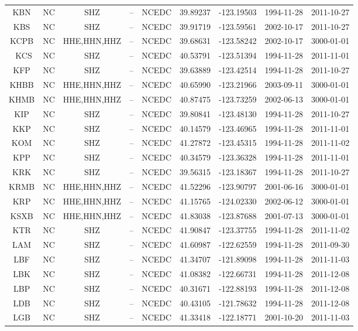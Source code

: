 \documentclass[draft]{agujournal2019}
\begin{document}
\begin{table}[hbt!]
\begin{tabular}{c c c c c c c c c}
KBN & NC & SHZ & -- & NCEDC & 39.89237 & -123.19503 & 1994-11-28 & 2011-10-27 \\
KBS & NC & SHZ & -- & NCEDC & 39.91719 & -123.59561 & 2002-10-17 & 2011-10-27 \\
KCPB & NC & HHE,HHN,HHZ & -- & NCEDC & 39.68631 & -123.58242 & 2002-10-17 & 3000-01-01 \\\
KCS & NC & SHZ & -- & NCEDC & 40.53791 & -123.51394 & 1994-11-28 & 2011-11-01 \\
KFP & NC & SHZ & -- & NCEDC & 39.63889 & -123.42514 & 1994-11-28 & 2011-10-27 \\
KHBB & NC & HHE,HHN,HHZ & -- & NCEDC & 40.65990 & -123.21966 & 2003-09-11 & 3000-01-01 \\
KHMB & NC & HHE,HHN,HHZ & -- & NCEDC & 40.87475 & -123.73259 & 2002-06-13 & 3000-01-01 \\
KIP & NC & SHZ & -- & NCEDC & 39.80841 & -123.48130 & 1994-11-28 & 2011-10-27 \\
KKP & NC & SHZ & -- & NCEDC & 40.14579 & -123.46965 & 1994-11-28 & 2011-11-01 \\
KOM & NC & SHZ & -- & NCEDC & 41.27872 & -123.45315 & 1994-11-28 & 2011-11-02 \\
KPP & NC & SHZ & -- & NCEDC & 40.34579 & -123.36328 & 1994-11-28 & 2011-11-01 \\
KRK & NC & SHZ & -- & NCEDC & 39.56315 & -123.18367 & 1994-11-28 & 2011-10-27 \\
KRMB & NC & HHE,HHN,HHZ & -- & NCEDC & 41.52296 & -123.90797 & 2001-06-16 & 3000-01-01 \\
KRP & NC & HHE,HHN,HHZ & -- & NCEDC & 41.15765 & -124.02330 & 2002-06-12 & 3000-01-01 \\
KSXB & NC & HHE,HHN,HHZ & -- & NCEDC & 41.83038 & -123.87688 & 2001-07-13 & 3000-01-01 \\
KTR & NC & SHZ & -- & NCEDC & 41.90847 & -123.37755 & 1994-11-28 & 2011-11-02 \\
LAM & NC & SHZ & -- & NCEDC & 41.60987 & -122.62559 & 1994-11-28 & 2011-09-30 \\
LBF & NC & SHZ & -- & NCEDC & 41.34707 & -121.89098 & 1994-11-28 & 2011-11-03 \\
LBK & NC & SHZ & -- & NCEDC & 41.08382 & -122.66731 & 1994-11-28 & 2011-12-08 \\
LBP & NC & SHZ & -- & NCEDC & 40.31671 & -122.88193 & 1994-11-28 & 2011-12-08 \\
LDB & NC & SHZ & -- & NCEDC & 40.43105 & -121.78632 & 1994-11-28 & 2011-12-08 \\
LGB & NC & SHZ & -- & NCEDC & 41.33418 & -122.18771 & 2001-10-20 & 2011-11-03 \\

\end{tabular}
\end{table}
\end{document}
